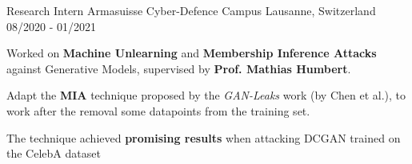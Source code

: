 \begin{cventries}
  \cventry
  {Research Intern} %
  {Armasuisse Cyber-Defence Campus} %
  {Lausanne, Switzerland} %
  {08/2020 - 01/2021} %
  {
    \begin{cvitems} %
      \item Worked on \textbf{Machine Unlearning} and \textbf{Membership Inference Attacks} against Generative Models, supervised by \textbf{Prof. Mathias Humbert}.
      \item Adapt the \textbf{MIA} technique proposed by the \textit{GAN-Leaks} work (by Chen et al.), to work after the removal some datapoints from the training set.
      \item The technique achieved \textbf{promising results} when attacking DCGAN trained on the CelebA dataset
    \end{cvitems}
  }


\end{cventries}
